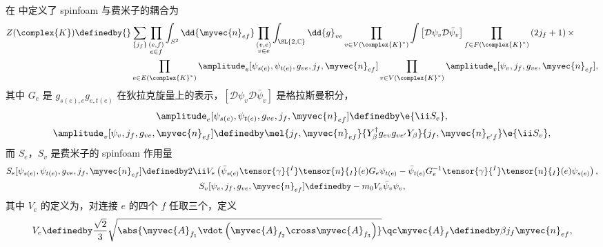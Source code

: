 	在\cite{Han2011} 中定义了 spinfoam 与费米子的耦合为
	\begin{equation}
		\begin{split}
			Z(\complex{K}) \definedby{}& \sum_{\{j_f\}} \prod_{\substack{(e,f)\\e\in f}} \int_{S^2} \dd{\myvec{n}_{ef}} \prod_{\substack{(v,e)\\v\in e}} \int_{\SL{2,\mathbb{C}}} \dd{g}_{ve} \prod_{v\in V(\complex{K}^*)}\int \left[ \mathcal{D} \psi_v \mathcal{D} \bar{\psi}_v \right] \prod_{f\in F(\complex{K}^*)} \left( 2j_f + 1 \right) \times\\
			&\prod_{e\in E(\complex{K}^*)} \amplitude_e[\psi_{s(e)},\psi_{t(e)},g_{ve},j_f,\myvec{n}_{ef}] \prod_{v\in V(\complex{K}^*)} \amplitude_v[\psi_v,j_f,g_{ve},\myvec{n}_{ef}],\label{eq-spinfoam_fermion}
		\end{split}
	\end{equation}
	其中 $G_e$ 是 $g_{s(e),e}g_{e,t(e)}$ 在狄拉克旋量上的表示，$\left[ \mathcal{D} \psi_v \mathcal{D} \bar{\psi}_v \right]$ 是格拉斯曼积分，
	\begin{equation}
		\begin{gathered}
			\amplitude_e[\psi_{s(e)},\psi_{t(e)},g_{ve},j_f,\myvec{n}_{ef}] \definedby \e{\ii S_e},\\
			\amplitude_v[\psi_v,j_f,g_{ve},\myvec{n}_{ef}] \definedby \mel{j_f,\myvec{n}_{ef}}{Y_\beta^\dagger g_{ev} g_{ve'} Y_\beta}{j_f,\myvec{n}_{e'f}} \e{\ii S_v},
		\end{gathered}
	\end{equation}
	而 $S_e$，$S_v$ 是费米子的 spinfoam 作用量
	\begin{equation}
		\begin{gathered}
			S_e[\psi_{s(e)},\psi_{t(e)},g_{ve},j_f,\myvec{n}_{ef}] \definedby 2 \ii V_e \left( \bar{\psi}_{s(e)} \tensor{\gamma}{^I} \tensor{n}{_I}(e) G_e \psi_{t(e)} - \bar{\psi}_{t(e)} G_e^{-1} \tensor{\gamma}{^I} \tensor{n}{_I}(e) \psi_{s(e)} \right),\\
			S_v[\psi_v,j_f,g_{ve},\myvec{n}_{ef}] \definedby -m_0 V_v \bar{\psi}_v \psi_v,
		\end{gathered}
	\end{equation}
	其中 $V_e$ 的定义为，对连接 $e$ 的四个 $f$ 任取三个，定义
	\begin{equation}
		V_e \definedby \frac{\sqrt{2}}{3} \sqrt{\abs{\myvec{A}_{f_1} \vdot \left( \myvec{A}_{f_2} \cross \myvec{A}_{f_3} \right)}} \qc \myvec{A}_{f} \definedby \beta j_f \myvec{n}_{ef},\label{eq-Ve}
	\end{equation}
